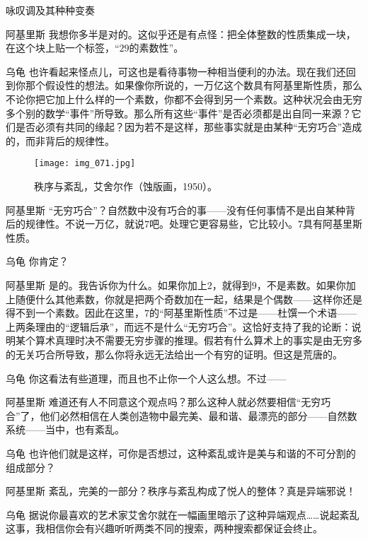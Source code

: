 \begin{dialog}{咏叹调及其种种变奏}
\begin{dialogue}
\item[阿基里斯]我想你多半是对的。这似乎还是有点怪：把全体整数的性质集成一块，在这个块上贴一个标签，“$29$的素数性”。

\item[乌龟]也许看起来怪点儿，可这也是看待事物一种相当便利的办法。现在我们还回到你那个假设性的想法。如果像你所说的，一万亿这个数具有阿基里斯性质，那么不论你把它加上什么样的一个素数，你都不会得到另一个素数。这种状况会由无穷多个别的数学“事件”所导致。那么所有这些“事件”是否必须都是出自同一来源？它们是否必须有共同的缘起？因为若不是这样，那些事实就是由某种“无穷巧合”造成的，而非背后的规律性。

\begin{figure}
\texttt{[image: img\_071.jpg]}
\caption[秩序与紊乱，艾舍尔作。]
  {秩序与紊乱，艾舍尔作（蚀版画，1950）。}
\end{figure}

\item[阿基里斯]“无穷巧合”？自然数中没有巧合的事——没有任何事情不是出自某种背后的规律性。不说一万亿，就说$7$吧。处理它更容易些，它比较小。$7$具有阿基里斯性质。

\item[乌龟]你肯定？

\item[阿基里斯]是的。我告诉你为什么。如果你加上$2$，就得到$9$，不是素数。如果你加上随便什么其他素数，你就是把两个奇数加在一起，结果是个偶数——这样你还是得不到一个素数。因此在这里，$7$的“阿基里斯性质”不过是——杜馔一个术语——上两条理由的“逻辑后承”，而远不是什么“无穷巧合”。这恰好支持了我的论断：说明某个算术真理时决不需要无穷步骤的推理。假若有什么算术上的事实是由无穷多的无关巧合所导致，那么你将永远无法给出一个有穷的证明。但这是荒唐的。

\item[乌龟]你这看法有些道理，而且也不止你一个人这么想。不过——

\item[阿基里斯]难道还有人不同意这个观点吗？那么这种人就必然要相信“无穷巧合”了，他们必然相信在人类创造物中最完美、最和谐、最漂亮的部分——自然数系统——当中，也有紊乱。

\item[乌龟]也许他们就是这样，可你是否想过，这种紊乱或许是美与和谐的不可分割的组成部分？

\item[阿基里斯]紊乱，完美的一部分？秩序与紊乱构成了悦人的整体？真是异端邪说！

\item[乌龟]据说你最喜欢的艺术家艾舍尔就在一幅画里暗示了这种异端观点……说起紊乱这事，我相信你会有兴趣听听两类不同的搜索，两种搜索都保证会终止。


\end{dialogue}
\end{dialog}
